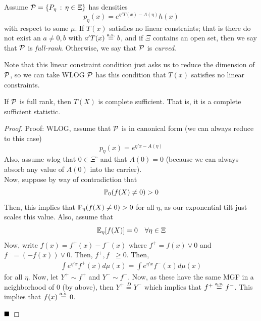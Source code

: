 \begin{definition}
    Assume $\cal{P} = \{P_{\eta} \col \eta \in \Xi\}$ has densities
    \[ p_{\eta}(x) = e^{\eta'T(x) - A(\eta)}h(x) \]
    with respect to some $\mu$. If $T(x)$ satisfies no linear constraints; that is there do not exist an $a \ne 0, b$ with $a'T(x) \overset{\tt{a.s.}}{=} b$, and if $\Xi$ contains an open set, then we say that $\cal{P}$ is \emph{full-rank}. Otherwise, we say that $\cal{P}$ is \emph{curved}.
\end{definition}
Note that this linear constraint condition just asks us to reduce the dimension of $\cal{P}$, so we can take WLOG $\cal{P}$ has this condition that $T(x)$ satisfies no linear constraints. \\

\begin{theorem}
    If $\cal{P}$ is full rank, then $T(X)$ is complete sufficient. That is, it is a complete sufficient statistic. 
\end{theorem}
\begin{proof}{Proof:}
    WLOG, assume that $\cal{P}$ is in canonical form (we can always reduce to this case)
    \[ p_{\eta}(x) = e^{\eta'x - A(\eta)} \]
    Also, assume wlog that $0 \in \Xi^{\circ}$ and that $A(0) = 0$ (because we can always absorb any value of $A(0)$ into the carrier).\\

    Now, suppose by way of contradiction that
    \[ \bb{P}_{0}(f(X) \ne 0) > 0 \]
    Then, this implies that $\bb{P}_{\eta}(f(X) \ne 0) > 0$ for all $\eta$, as our exponential tilt just scales this value. Also, assume that
    \[ \bb{E}_{\eta}[f(X)] = 0 \quad \forall \eta \in \Xi \]
    Now, write $f(x) = f^{+}(x) - f^{-}(x)$ where $f^{+} = f(x) \vee 0$ and $f^{-} = (-f(x)) \vee 0$. Then, $f^{+}, f^{-} \geq 0$. Then, 
    \begin{align*}
        \int e^{\eta'x}f^{+}(x) d\mu(x) = \int e^{\eta'x}f^{-}(x)d\mu(x)
    \end{align*}
    for all $\eta$. Now, let $Y^{+} \sim f^{+}$ and $Y^{-} \sim f^{-}$. Now, as these have the same MGF in a neighborhood of $0$ (by above), then $Y^{+} \overset{D}{=} Y^{-}$ which implies that $f^{+} \overset{\tt{a.s.}}{=} f^{-}$. This implies that $f(x) \overset{\tt{a.s.}}{=} 0$. 

    $\qed$
\end{proof}

